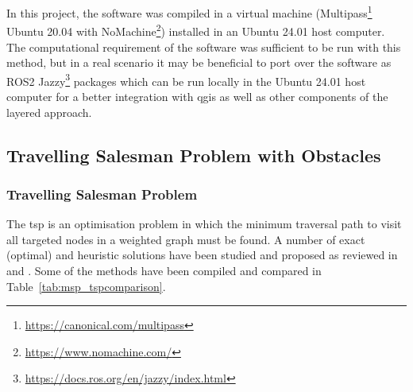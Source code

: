 In this project, the software was compiled in a virtual machine (Multipass\footnote{\url{https://canonical.com/multipass}} Ubuntu 20.04 with NoMachine\footnote{\url{https://www.nomachine.com/}}) installed in an Ubuntu 24.01 host computer. The computational requirement of the software was sufficient to be run with this method, but in a real scenario it may be beneficial to port over the software as ROS2 Jazzy\footnote{\url{https://docs.ros.org/en/jazzy/index.html}} packages which can be run locally in the Ubuntu 24.01 host computer for a better integration with \gls{qgis} as well as other components of the layered approach. 

\subsection{Travelling Salesman Problem with Obstacles}
\label{sec:msp_tspo}

\subsubsection{Travelling Salesman Problem}

The \gls{tsp} is an optimisation problem in which the minimum traversal path to visit all targeted nodes in a weighted graph must be found. A number of exact (optimal) and heuristic solutions have been studied and proposed as reviewed in \cite{laporte1992tsp} and \cite{zhang2023tsp}. Some of the methods have been compiled and compared in Table~\ref{tab:msp_tspcomparison}.  

